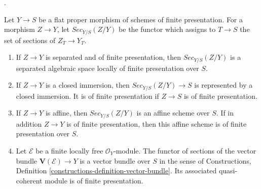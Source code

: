 \begin{proposition}
\label{proposition-sections-proper-flat}
\begin{reference}
\cite[Expos\'e 221, Section 7]{FGA}.
\end{reference}
Let $Y \to S$ be a flat proper morphism of schemes of finite presentation.
For a morphism $Z \to Y$, let $\mathit{Sec}_{Y/S}(Z/Y)$ be the functor
which assigns to $T \to S$ the set of sections of $Z_T \to Y_T$.
\begin{enumerate}
\item If $Z \to Y$ is separated and of finite presentation, then
$\mathit{Sec}_{Y/S}(Z/Y)$ is a separated algebraic space locally of finite
presentation over $S$.
\item If $Z \to Y$ is a closed immersion, then
$\mathit{Sec}_{Y/S}(Z/Y) \to S$ is represented by a closed immersion. It is
of finite presentation if $Z \to S$ is of finite presentation.
\item If $Z \to Y$ is affine, then $\mathit{Sec}_{Y/S}(Z/Y)$ is an affine
scheme over $S$. If in addition $Z \to Y$ is of finite presentation, then
this affine scheme is of finite presentation over $S$.
\item Let $\mathcal{E}$ be a finite locally free $\mathcal{O}_Y$-module. The
functor of sections of the vector bundle
$\mathbf{V}(\mathcal{E}) \to Y$ is a vector bundle over $S$ in the sense of
Constructions, Definition \ref{constructions-definition-vector-bundle}. Its
associated quasi-coherent module is of finite presentation.
\end{enumerate}
\end{proposition}


